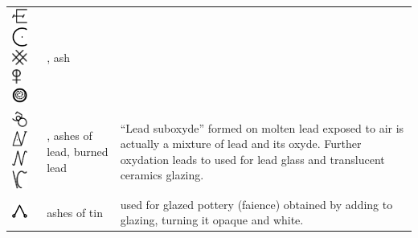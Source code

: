 \documentclass[british,final,landscape]{scrartcl}
\begin{document}
\begin{refsection}
 \tablelasttail{\bottomrule}\label{tab:mix}
 \begin{supertabular}{p{0.3\textwidth}p{0.34\textwidth}p{0.34\textwidth}}
   \includegraphics[width=5mm]{Mixtures/Ash} \includegraphics[width=5mm]{Mixtures/Ash2} \includegraphics[width=5mm]{Mixtures/Ash3} \includegraphics[height=5mm]{Mixtures/Ash4} \includegraphics[width=5mm]{Mixtures/Ash5} & , ash & \\
   \includegraphics[width=5mm]{Mixtures/AshesOfLead} \includegraphics[width=5mm]{Mixtures/AshesOfLead2} \includegraphics[width=5mm]{Mixtures/AshesOfLead3} \includegraphics[width=5mm]{Mixtures/AshesOfLead4} & , ashes of lead, burned lead & ``Lead suboxyde''  formed on molten lead exposed to air is actually a mixture of lead and its oxyde. Further oxydation leads to  used for lead glass and translucent ceramics glazing.\\
   \includegraphics[width=5mm]{Mixtures/AshesOfTin} & ashes of tin &  used for glazed pottery (faience) obtained by adding  to  glazing, turning it opaque and white.  \\

\end{supertabular}
\end{refsection}
\end{document}

